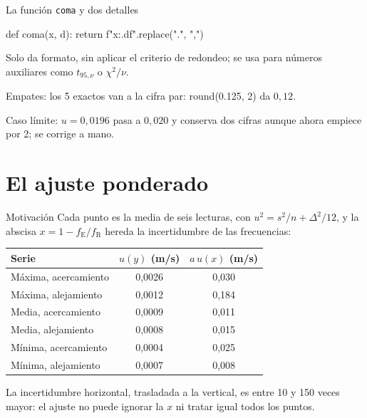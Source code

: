 \documentclass[10pt]{beamer}
\newcommand{\cod}[1]{{\setlength{\fboxsep}{1.4pt}\colorbox{codinline}{\textcolor{codrojo}{\ttfamily\small #1}}}}
\newcommand{\resalta}[1]{\textcolor{structure.fg!75!white}{#1}}
\newcommand{\fE}{f_{\mathrm{E}}}
\newcommand{\fR}{f_{\mathrm{R}}}
\begin{document}
\begin{frame}[fragile]{La función \texttt{coma} y dos detalles}
  \begin{codigo}
def coma(x, d):
    return f"{x:.{d}f}".replace(".", ",")
  \end{codigo}
  Solo da formato, sin aplicar el criterio de redondeo; se usa para números
  auxiliares como $t_{95,\nu}$ o $\chi^{2}/\nu$.
  \begin{block}{}
    \resalta{Empates:} los 5 exactos van a la cifra par: \cod{round(0.125, 2)}
    da $0{,}12$.
  \end{block}
  \begin{block}{}
    \resalta{Caso límite:} $u=0{,}0196$ pasa a $0{,}020$ y conserva dos cifras
    aunque ahora empiece por 2; se corrige a mano.
  \end{block}
\end{frame}

\section{El ajuste ponderado}
\begin{frame}{Motivación}
  Cada punto es la media de seis lecturas, con $u^{2}=s^{2}/n+\Delta^{2}/12$, y la
  abscisa $x=1-\fE/\fR$ hereda la incertidumbre de las frecuencias:
  \begin{center}\small
  \begin{tabular}{@{}lcc@{}}
    \toprule
    Serie & $u(y)$ (m/s) & $a\,u(x)$ (m/s)\\
    \midrule
    Máxima, acercamiento & 0,0026 & 0,030\\
    Máxima, alejamiento & 0,0012 & \resalta{0,184}\\
    Media, acercamiento & 0,0009 & 0,011\\
    Media, alejamiento & 0,0008 & 0,015\\
    Mínima, acercamiento & 0,0004 & 0,025\\
    Mínima, alejamiento & 0,0007 & 0,008\\
    \bottomrule
  \end{tabular}
  \end{center}
  \begin{block}{}
    La incertidumbre horizontal, trasladada a la vertical, es entre 10 y 150 veces
    mayor: el ajuste no puede ignorar la $x$ ni tratar igual todos los puntos.
  \end{block}
\end{frame}
\end{document}
